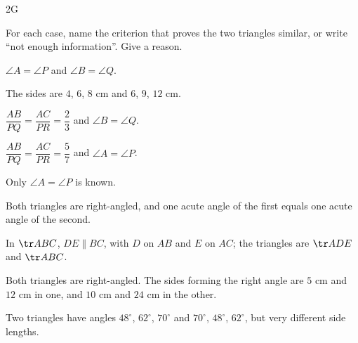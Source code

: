 
\begin{exercise}{2G}
  \item[] \hspace*{-\leftmargin}\parbox[t]{\textwidth}{For each case, name the criterion that proves the two triangles similar, or write ``not enough information''. Give a reason.}
  \item $\angle A=\angle P$ and $\angle B=\angle Q$.
  \item The sides are $4$, $6$, $8$ cm and $6$, $9$, $12$ cm.
  \item $\dfrac{AB}{PQ}=\dfrac{AC}{PR}=\dfrac23$ and $\angle B=\angle Q$.
  \item $\dfrac{AB}{PQ}=\dfrac{AC}{PR}=\dfrac57$ and $\angle A=\angle P$.
  \item Only $\angle A=\angle P$ is known.
  \item Both triangles are right-angled, and one acute angle of the first equals one acute angle of the second.
  \item In $\tr ABC$, $DE\parallel BC$, with $D$ on $AB$ and $E$ on $AC$; the triangles are $\tr ADE$ and $\tr ABC$.
  \item Both triangles are right-angled. The sides forming the right angle are $5$ cm and $12$ cm in one, and $10$ cm and $24$ cm in the other.
  \item Two triangles have angles $48^\circ$, $62^\circ$, $70^\circ$ and $70^\circ$, $48^\circ$, $62^\circ$, but very different side lengths.
\end{exercise}

